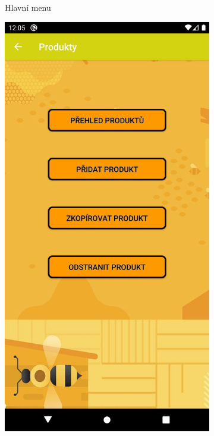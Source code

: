 \documentclass[12pt]{report}
\begin{document}
\begin{figure}[H]
\begin{subfigure}{.3\textwidth}
	  \caption{Hlavní menu}
	  \label{fig:main_menu_img}
	\end{subfigure}
	\begin{subfigure}{.3\textwidth}
	  \centering
	  \includegraphics[width=\textwidth]{img/product_menu.png}

\end{subfigure}
\end{figure}
\end{document}
